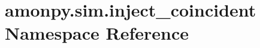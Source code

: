 \hypertarget{namespaceamonpy_1_1sim_1_1inject__coincident}{\section{amonpy.\-sim.\-inject\-\_\-coincident Namespace Reference}
\label{namespaceamonpy_1_1sim_1_1inject__coincident}
}
